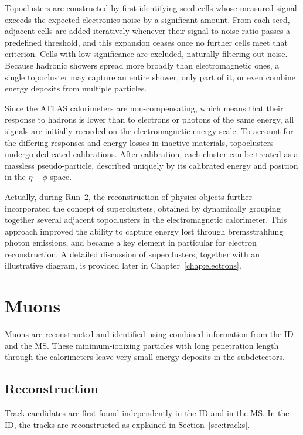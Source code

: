 Topoclusters are constructed by first identifying seed cells whose measured signal exceeds the expected electronics noise by a significant amount. From each seed, adjacent cells are added iteratively whenever their signal-to-noise ratio passes a predefined threshold, and this expansion ceases once no further cells meet that criterion. Cells with low significance are excluded, naturally filtering out noise. Because hadronic showers spread more broadly than electromagnetic ones, a single topocluster may capture an entire shower, only part of it, or even combine energy deposits from multiple particles. 

Since the ATLAS calorimeters are non-compensating, which means that their response to hadrons is lower than to electrons or photons of the same energy, all signals are initially recorded on the electromagnetic energy scale. To account for the differing responses and energy losses in inactive materials, topoclusters undergo dedicated calibrations. After calibration, each cluster can be treated as a massless pseudo-particle, described uniquely by its calibrated energy and position in the $\eta - \phi$ space. 

Actually, during Run~2, the reconstruction of physics objects further incorporated the concept of superclusters, obtained by dynamically grouping together several adjacent topoclusters in the electromagnetic calorimeter. This approach improved the ability to capture energy lost through bremsstrahlung photon emissions, and became a key element in particular for electron reconstruction. A detailed discussion of superclusters, together with an illustrative diagram, is provided later in Chapter~\ref{chap:electrons}.

\section{Muons}
\label{sec:muons}

Muons are reconstructed and identified using combined information from the ID and the MS. These minimum-ionizing particles with long penetration length through the calorimeters leave very small energy deposits in the subdetectors.
\subsection*{Reconstruction} 
Track candidates are first found independently in the ID and in the MS. In the ID, the tracks are reconstructed as explained in Section~\ref{sec:tracks}.

